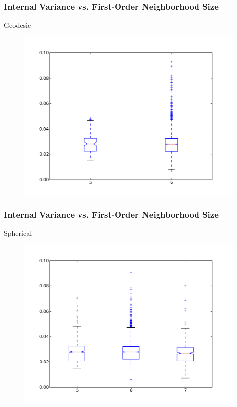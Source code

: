 \documentclass[nototal,handout]{beamer}
\begin{document}
\begin{frame}
	\frametitle{Internal Variance vs. First-Order Neighborhood Size}
 
\begin{block}{Geodesic}
  \begin{center}
  \begin{figure}
  \includegraphics[width=0.75\linewidth]{geodesic_iv_box.png}
  \end{figure}
  \end{center}
 \end{block} \end{frame} 

\begin{frame}
	\frametitle{Internal Variance vs. First-Order Neighborhood Size}
 
\begin{block}{Spherical}
  \begin{center}
  \begin{figure}
  \includegraphics[width=0.75\linewidth]{graph_iv_box.png}
  \end{figure}
  \end{center}
 \end{block} \end{frame} 
\end{document}
